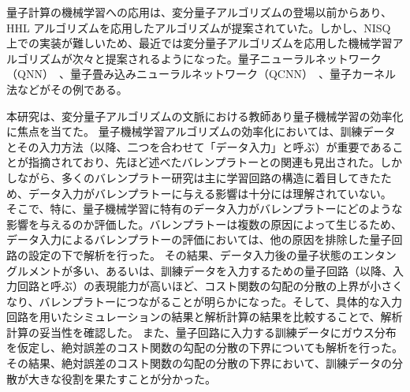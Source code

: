 量子計算の機械学習への応用は、変分量子アルゴリズムの登場以前からあり、HHL アルゴリズムを応用したアルゴリズムが提案されていた。しかし、NISQ 上での実装が難しいため、最近では変分量子アルゴリズムを応用した機械学習アルゴリズムが次々と提案されるようになった。量子ニューラルネットワーク（QNN）~\cite{farhi2018classification,mitarai2018quantum}、量子畳み込みニューラルネットワーク（QCNN）~\cite{cong2019quantum}、量子カーネル法\cite{havlicek2019supervised,schuld2019quantum}などがその例である。

本研究は、変分量子アルゴリズムの文脈における教師あり量子機械学習の効率化に焦点を当てた。
量子機械学習アルゴリズムの効率化においては、訓練データとその入力方法（以降、二つを合わせて「データ入力」と呼ぶ）が重要であることが指摘されており\cite{huang2021power,caro2021encodingdependent}、先ほど述べたバレンプラトーとの関連も見出された\cite{thanasilp2021subtleties,thanasilp2022exponential}。しかしながら、多くのバレンプラトー研究は主に学習回路の構造に着目してきたため、データ入力がバレンプラトーに与える影響は十分には理解されていない。
そこで、特に、量子機械学習に特有のデータ入力がバレンプラトーにどのような影響を与えるのか評価した。バレンプラトーは複数の原因によって生じるため、データ入力によるバレンプラトーの評価においては、他の原因を排除した量子回路の設定の下で解析を行った。
その結果、データ入力後の量子状態のエンタングルメントが多い、あるいは、訓練データを入力するための量子回路（以降、入力回路と呼ぶ）の表現能力が高いほど、コスト関数の勾配の分散の上界が小さくなり、バレンプラトーにつながることが明らかになった。そして、具体的な入力回路を用いたシミュレーションの結果と解析計算の結果を比較することで、解析計算の妥当性を確認した。
また、量子回路に入力する訓練データにガウス分布を仮定し、絶対誤差のコスト関数の勾配の分散の下界についても解析を行った。その結果、絶対誤差のコスト関数の勾配の分散の下界において、訓練データの分散が大きな役割を果たすことが分かった。




